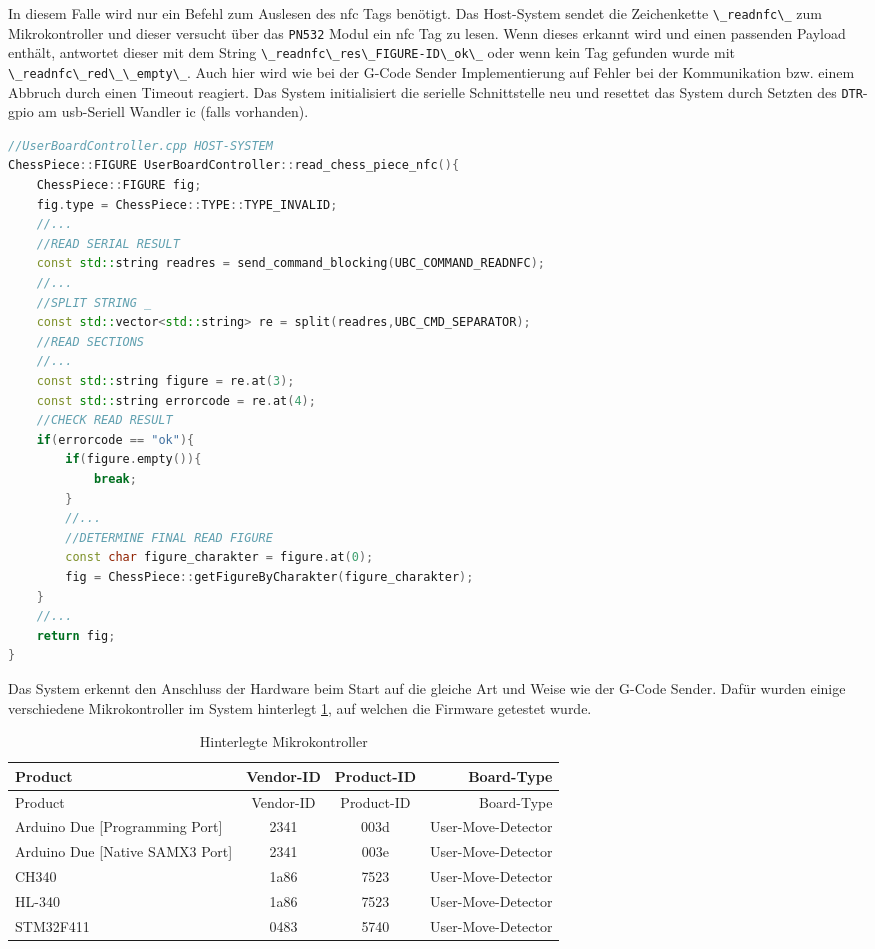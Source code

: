 In diesem Falle wird nur ein Befehl zum Auslesen des \gls{nfc} Tags
benötigt. Das Host-System sendet die Zeichenkette
\passthrough{\lstinline!\_readnfc\_!} zum Mikrokontroller und dieser
versucht über das \passthrough{\lstinline!PN532!} Modul ein \gls{nfc}
Tag zu lesen. Wenn dieses erkannt wird und einen passenden Payload
enthält, antwortet dieser mit dem String
\passthrough{\lstinline!\_readnfc\_res\_FIGURE-ID\_ok\_!} oder wenn kein
Tag gefunden wurde mit
\passthrough{\lstinline!\_readnfc\_red\_\_empty\_!}. Auch hier wird wie
bei der G-Code Sender Implementierung auf Fehler bei der Kommunikation
bzw. einem Abbruch durch einen Timeout reagiert. Das System
initialisiert die serielle Schnittstelle neu und resettet das System
durch Setzten des \passthrough{\lstinline!DTR!}-\gls{gpio} am
\gls{usb}-Seriell Wandler \gls{ic} (falls vorhanden).

\begin{lstlisting}[language={C++}]
//UserBoardController.cpp HOST-SYSTEM
ChessPiece::FIGURE UserBoardController::read_chess_piece_nfc(){
    ChessPiece::FIGURE fig;
    fig.type = ChessPiece::TYPE::TYPE_INVALID;
    //...
    //READ SERIAL RESULT
    const std::string readres = send_command_blocking(UBC_COMMAND_READNFC);
    //...
    //SPLIT STRING _
    const std::vector<std::string> re = split(readres,UBC_CMD_SEPARATOR);
    //READ SECTIONS
    //...
    const std::string figure = re.at(3);
    const std::string errorcode = re.at(4);
    //CHECK READ RESULT
    if(errorcode == "ok"){
        if(figure.empty()){
            break;
        }
        //...
        //DETERMINE FINAL READ FIGURE
        const char figure_charakter = figure.at(0);
        fig = ChessPiece::getFigureByCharakter(figure_charakter);
    }
    //...
    return fig;
}
\end{lstlisting}

Das System erkennt den Anschluss der Hardware beim Start auf die gleiche
Art und Weise wie der G-Code Sender. Dafür wurden einige verschiedene
Mikrokontroller im System hinterlegt \ref{umbdctl}, auf welchen die
Firmware getestet wurde.

\begin{longtable}[]{@{}lccr@{}}
\caption{Hinterlegte Mikrokontroller \label{umbdctl}}\tabularnewline
\toprule
Product & Vendor-ID & Product-ID & Board-Type\tabularnewline
\midrule
\endfirsthead
\toprule
Product & Vendor-ID & Product-ID & Board-Type\tabularnewline
\midrule
\endhead
Arduino Due {[}Programming Port{]} & 2341 & 003d &
User-Move-Detector\tabularnewline
Arduino Due {[}Native SAMX3 Port{]} & 2341 & 003e &
User-Move-Detector\tabularnewline
CH340 & 1a86 & 7523 & User-Move-Detector\tabularnewline
HL-340 & 1a86 & 7523 & User-Move-Detector\tabularnewline
STM32F411 & 0483 & 5740 & User-Move-Detector\tabularnewline
\bottomrule
\end{longtable}

